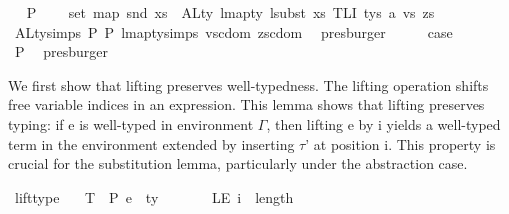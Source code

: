 \begin{isabellebody}
\ \isamarkupfalse%
\ P{}{}{\isacharcolon}{\kern0pt}\isanewline
\ \ \ \ {\isachardoublequoteopen}set\ {\isacharparenleft}{\kern0pt}map\ snd\ xs{\isacharparenright}{\kern0pt}\ {\isacharequal}{\kern0pt}\ ALty\ {\isacharparenleft}{\kern0pt}lmap{\isacharunderscore}{\kern0pt}ty\ {\isacharparenleft}{\kern0pt}lsubst\ xs{\isacharparenright}{\kern0pt}\ {\isacharparenleft}{\kern0pt}TLI\ tys\ a\ vs\ zs{\isacharparenright}{\kern0pt}{\isacharparenright}{\kern0pt}{\isachardoublequoteclose}\isanewline
\ \ \ \ \isamarkupfalse%
\ ALty{\isachardot}{\kern0pt}simps{\isacharparenleft}{\kern0pt}{}{\isacharparenright}{\kern0pt}\ P{}{}\ P{}{}\ lmap{\isacharunderscore}{\kern0pt}ty{\isachardot}{\kern0pt}simps{\isacharparenleft}{\kern0pt}{}{\isacharparenright}{\kern0pt}\ vs{\isacharunderscore}{\kern0pt}cdom\ zs{\isacharunderscore}{\kern0pt}cdom\ \isamarkupfalse%
\ presburger\isanewline
\ \ \isamarkupfalse%
\ \isamarkupfalse%
\ {\isacharquery}{\kern0pt}case\isanewline
\ \ \ \ \isamarkupfalse%
\ P{}{}\ \isamarkupfalse%
\ presburger\isanewline
{}\isamarkupfalse%
%
\endisatagproof
{\isafoldproof}%
%
\isadelimproof
%
\endisadelimproof
%
\isadelimdocument
%
\endisadelimdocument
%
\isatagdocument
%
\isamarkuptrue%
%
\isamarkuptrue%
%
\endisatagdocument
{\isafolddocument}%
%
\isadelimdocument
%
\endisadelimdocument
%
\begin{isamarkuptext}%
We first show that lifting preserves well-typedness.
The lifting operation shifts free variable indices in an expression.
This lemma shows that lifting preserves typing:
if e is well-typed in environment $\Gamma$,
then lifting e by i yields a well-typed term in the environment
extended by inserting $\tau$' at position i.
This property is crucial for the substitution lemma,
particularly under the abstraction case.%
\end{isamarkuptext}\isamarkuptrue%
\isamarkupfalse%
\ lift{\isacharunderscore}{\kern0pt}type{\isacharcolon}{\kern0pt}\isanewline
\ \ \ T{\isacharcolon}{\kern0pt}\ {\isachardoublequoteopen}{\isasymGamma}\ {\isasymturnstile}{\isacharbraceleft}{\kern0pt}P{\isacharbraceright}{\kern0pt}\ e\ {\isacharcolon}{\kern0pt}\ ty{\isachardoublequoteclose}\isanewline
\ \ \ \ \ \ \ LE{\isacharcolon}{\kern0pt}\ {\isachardoublequoteopen}i\ {\isasymle}\ length\ {\isasymGamma}{\isachardoublequoteclose}\isanewline

\end{isabellebody}
